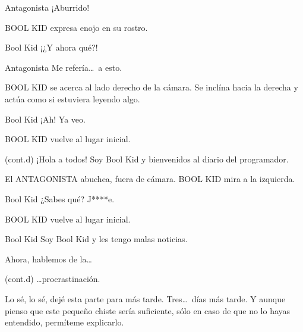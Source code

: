 \documentclass{screenplay}[2018/01/07]
\begin{document}
    \begin{dialogue}{Antagonista}
        ¡Aburrido!
    \end{dialogue}

    BOOL KID expresa enojo en su rostro.

    \begin{dialogue}{Bool Kid}
        ¡¿Y ahora qué?!
    \end{dialogue}

    \begin{dialogue}{Antagonista}
        Me refería\dots\ a esto.
    \end{dialogue}

    BOOL KID se acerca al lado derecho de la cámara. Se inclína hacia la derecha
    y actúa como si estuviera leyendo algo.

    \begin{dialogue}{Bool Kid}
        ¡Ah! Ya veo.
    \end{dialogue}


    BOOL KID vuelve al lugar inicial.

    \begin{dialogue}{(cont.d)}
        ¡Hola a todos! Soy Bool Kid y bienvenidos al diario del programador.
    \end{dialogue}

    El ANTAGONISTA abuchea, fuera de cámara.
    BOOL KID mira a la izquierda.

    \begin{dialogue}[shouting]{Bool Kid}
        ¿Sabes qué? J****e.
    \end{dialogue}

    BOOL KID vuelve al lugar inicial.

    \begin{dialogue}{Bool Kid}
        Soy Bool Kid y les tengo malas noticias.

        Ahora, hablemos de la\dots
    \end{dialogue}



    \begin{dialogue}{(cont.d)}
        \dots procrastinación.

        Lo sé, lo sé, dejé esta parte para más tarde. Tres\dots\ días más tarde.
        Y aunque pienso que este pequeño chiste sería suficiente, sólo en caso
        de que no lo hayas entendido, permíteme explicarlo.
    \end{dialogue}
\end{document}
